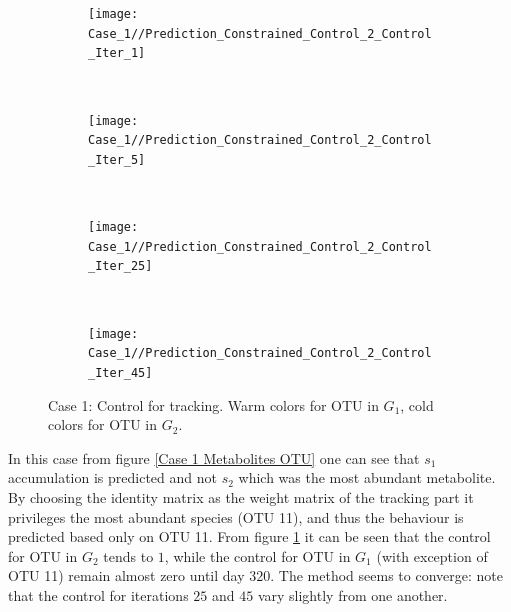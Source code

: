 \documentclass[3p,times]{elsarticle}
\begin{document}
\clearpage

\begin{figure}
	\centering
	\begin{subfigure}[b]{0.32\textheight}
		\texttt{[image: Case\_1//Prediction\_Constrained\_Control\_2\_Control\_Iter\_1]}
	\end{subfigure}
	~
	\begin{subfigure}[b]{0.32\textheight}
		\texttt{[image: Case\_1//Prediction\_Constrained\_Control\_2\_Control\_Iter\_5]}
	\end{subfigure}
	~
	\begin{subfigure}[b]{0.32\textheight}
		\texttt{[image: Case\_1//Prediction\_Constrained\_Control\_2\_Control\_Iter\_25]}
	\end{subfigure}
	~
	\begin{subfigure}[b]{0.32\textheight}
	\texttt{[image: Case\_1//Prediction\_Constrained\_Control\_2\_Control\_Iter\_45]}
	\end{subfigure}
	\caption{Case 1: Control for tracking. Warm colors for OTU in $G_1$, cold colors for OTU in $G_2$.}
	\label{Case 1 Control}
\end{figure}  
In this case from figure \ref{Case 1 Metabolites OTU} one can see that $s_1$ accumulation is predicted and not $s_2$ which was the most abundant metabolite. By choosing the identity matrix as the weight matrix of the tracking part it privileges the most abundant species (OTU 11), and thus the behaviour is predicted based only on OTU 11. From figure \ref{Case 1 Control} it can be seen that the control for OTU in $G_2$ tends to $1$, while the control for OTU in $G_1$ (with exception of OTU 11) remain almost zero until day $320$. The method seems to converge: note that the control for iterations $25$ and $45$ vary slightly from one another.
\end{document}
